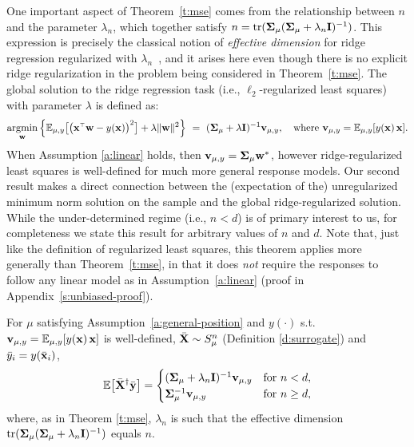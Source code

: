 \documentclass[thesis.tex]{subfiles}
\begin{document}
One important aspect of Theorem~\ref{t:mse} comes from the relationship between $n$ and the parameter $\lambda_n$, which together satisfy $n=\mathrm{tr}(\mathbf{\Sigma}_\mu (\mathbf{\Sigma}_\mu+\lambda_n\mathbf I)^{-1})$.
This expression is precisely the classical notion of \emph{effective
  dimension} for ridge regression regularized with
$\lambda_n$~\citep{ridge-leverage-scores}, and it arises here even though there is
no explicit ridge regularization in the problem being considered in
Theorem~\ref{t:mse}.
The global solution to the ridge regression task (i.e., $\ell_2$-regularized
least squares) with parameter $\lambda$ is defined as:
\begin{align*}
  \argmin_\w \Big\{\E_{\mu,y}\big[\big(\x^\top\w-y(\x)\big)^2\big]
  + \lambda\|\w\|^2\Big\}\ =\ (\Sigmab_\mu +
  \lambda\I)^{-1}\v_{\mu,y},\quad\text{where } \v_{\mu,y}=\E_{\mu,y}[y(\x)\,\x ].
\end{align*}
When Assumption \ref{a:linear} holds, then
$\mathbf v_{\mu,y}=\mathbf{\Sigma}_\mu\mathbf w^*$, however ridge-regularized least squares
is well-defined for much more general response models.
Our second result makes a direct connection between the (expectation
of the) unregularized minimum norm solution on the sample
and the global ridge-regularized solution.
While the under-determined regime (i.e., $n<d$) is of primary interest to us,
for completeness we state this result for arbitrary values of $n$ and $d$.
Note that, just like the definition of regularized least squares, this
theorem applies more generally than Theorem~\ref{t:mse}, in that it
does \emph{not} require the responses to follow any linear model as in
Assumption~\ref{a:linear} (proof in Appendix~\ref{s:unbiased-proof}).
\begin{theorem}
  \label{t:unbiased}
  For $\mu$ satisfying
  Assumption~\ref{a:general-position} and
  $y(\cdot)$ s.t.~$\mathbf v_{\mu,y}=\mathbb E_{\mu,y}[y(\mathbf x)\,\mathbf x]$ is well-defined,
  ${\bar{\mathbf X}}\sim S_\mu^n$ (Definition \ref{d:surrogate}) and ${\bar y}_i=y(\bar{\mathbf x}_i)$,
  \begin{align*}
    \mathbb E\big[{\bar{\mathbf X}}^\dagger\bar{\mathbf y}\big] =
    \begin{cases}
      (\mathbf{\Sigma}_\mu + \lambda_n\mathbf I)^{-1}\mathbf v_{\mu,y} & \text{for }n<d,     \\
      \mathbf{\Sigma}_\mu^{-1}\mathbf v_{\mu,y}                 & \text{for }n \ge d,
    \end{cases}
  \end{align*}
  where, as in Theorem \ref{t:mse}, $\lambda_n$ is such that the effective dimension
  $\mathrm{tr}(\mathbf{\Sigma}_\mu(\mathbf{\Sigma}_\mu+\lambda_n\mathbf I)^{-1})$ equals $n$.
\end{theorem}
\end{document}
